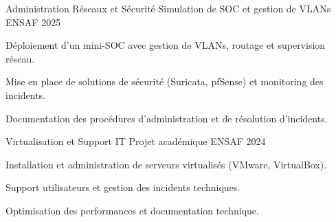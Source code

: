 
\begin{cventries}
    \cventry
    {Administration Réseaux et Sécurité}
    {Simulation de SOC et gestion de VLANs}
    {ENSAF}
    {2025}
    {
        \begin{cvitems}
            \item {Déploiement d'un mini-SOC avec gestion de VLANs, routage et supervision réseau.}
            \item {Mise en place de solutions de sécurité (Suricata, pfSense) et monitoring des incidents.}
            \item {Documentation des procédures d'administration et de résolution d'incidents.}
        \end{cvitems}
    }
    \cventry
    {Virtualisation et Support IT}
    {Projet académique}
    {ENSAF}
    {2024}
    {
        \begin{cvitems}
            \item {Installation et administration de serveurs virtualisés (VMware, VirtualBox).}
            \item {Support utilisateurs et gestion des incidents techniques.}
            \item {Optimisation des performances et documentation technique.}
        \end{cvitems}
    }
\end{cventries}